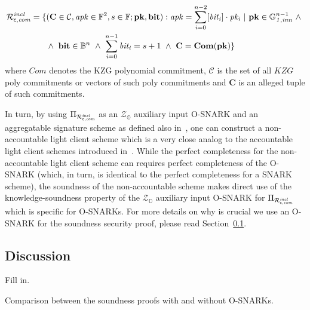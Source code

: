 \begin{align*}
 {\Rvtcom} = \{&(\mathbf{C} \in \mathcal{C}, \mathit{apk} \in \mathbb{F}^2, s \in \mathbb{F}; \mathbf{pk}, \mathbf{bit}) : 
                       \mathit{apk} = \sum_{i=0}^{n-2} [\mathit{bit_i}] \cdot \mathit{pk_i} \  | \ \mathbf{pk} \in \ginn{1}^{n-1} \ \wedge \  \\
                       & \wedge \ \mathbf{bit} \in \mathbb{B}^n \ \wedge \ \sum_{i=0}^{n-1} \mathit{bit_i} = s+1 \ \wedge \ \mathbf{C} = \mathbf{Com}(\mathbf{pk}) \} 
\end{align*}
\noindent where $\mathit{Com}$ denotes the KZG polynomial commitment, 
$\mathcal{C}$ is the set of all $\mathit{KZG}$ poly commitments or vectors of such poly commitments and $\mathbf{C}$ is an alleged tuple of such commitments.


\noindent In turn, by using $\Pi_{\mathcal{R}^{\mathit{incl}}_{\mathsf{c},\mathit{com}}}$ as an $\mathcal{Z}_{\mathbb{O}}$ auxiliary input O-SNARK and an aggregatable signature 
scheme as defined also in~\cite{LC_paper}, one can construct a non-accountable light client scheme which is a very close analog 
to the accountable light client schemes introduced in~\cite{LC_paper}. While the perfect completeness for the non-accountable light client scheme 
can requires perfect completeness of the O-SNARK (which, in turn, is identical to the perfect completeness for a SNARK scheme), 
the soundness of the non-accountable scheme makes direct use of the knowledge-soundness 
property of the $\mathcal{Z}_{\mathbb{O}}$ auxiliary input O-SNARK for $\Pi_{\mathcal{R}^{\mathit{incl}}_{\mathsf{c},\mathit{com}}}$ which is specific for O-SNARKs. 
For more details on why is crucial we use an O-SNARK for the soundness security proof, please read Section~\ref{sec:discussion}.

\subsection{Discussion}
\label{sec:discussion}

{\color{red} Fill in.}

{\color{red} Comparison between the soundness proofs with and without O-SNARKs.}

